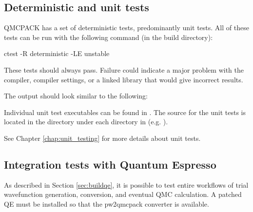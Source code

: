 \subsection{Deterministic and unit tests}

QMCPACK has a set of deterministic tests, predominantly unit tests.
All of these tests can be run with the following command (in the build directory):

\begin{shade}
ctest -R deterministic -LE unstable
\end{shade}

These tests should always pass. Failure could indicate a major problem
with the compiler, compiler settings, or a linked library that would
give incorrect results.

The output should look similar to the following:


Individual unit test executables can be found in .
The source for the unit tests is located in the  directory under each directory in  (e.g. ).

See Chapter \ref{chap:unit_testing} for more details about unit tests.

\subsection{Integration tests with Quantum Espresso}
\label{sec:integtestqe}
As described in Section \ref{sec:buildqe}, it is possible to test entire
workflows of trial wavefunction generation, conversion, and eventual
QMC calculation. A patched QE must be installed so that the
pw2qmcpack converter is available.


